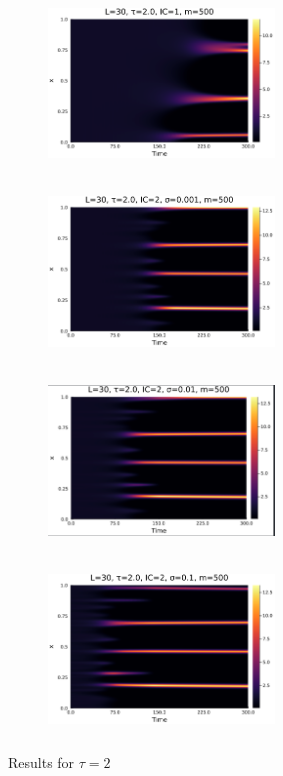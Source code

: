 \documentclass[12pt,a4paper]{article}
\begin{document}
\begin{figure}[H]
    \centering
    \begin{subfigure}[b]{0.45\linewidth}
        \centering
        \includegraphics[width=6cm,height = 4.5cm]{l30t2ic1.png}
        \caption{}
        \label{}
    \end{subfigure}
    \hfill
    \begin{subfigure}[b]{0.45\linewidth}
        \centering
        \includegraphics[width=6cm,height = 4.5cm]{l30t2ic2s1e3.png}
        \caption{}
        \label{}
    \end{subfigure}
    \hfill
    \begin{subfigure}[b]{0.45\linewidth}
        \centering
        \includegraphics[width=6cm,height = 4.5cm]{l30t2ic2s1e2.png}
        \caption{}
        \label{}
    \end{subfigure}
    \hfill
    \begin{subfigure}[b]{0.45\linewidth}
        \centering
        \includegraphics[width=6cm,height = 4.5cm]{l30t2ic2s1e1.png}
        \caption{}
        \label{}
    \end{subfigure}
    \caption{Results for $\tau=2$}
    \label{}
\end{figure}
\end{document}
